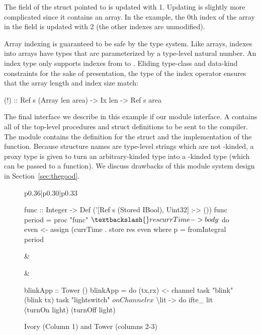 The  field of the struct pointed to is updated with 1.  Updating
 is slightly more complicated since it contains an array. In
the example, the 0th index of the array in the  field is updated with 2
(the other indexes are unmodified).

Array indexing is guaranteed to be safe by the type system.  Like arrays,
indexes into arrays have types that are parameterized by a type-level natural
number.  An index type  only supports indexes from  to .
Eliding type-class and data-kind constraints for the sake of presentation, the
type of the index operator ensures that the array length and index size match:
\begin{code}
(!) :: Ref s (Array len area) -> Ix len -> Ref s area
\end{code}

The final interface we describe in this example if our module interface.
A  contains all of the top-level procedures and struct definitions to
be sent to the compiler.  The module  contains the definition
for the struct and the implementation of the function.  Because structure names
are type-level strings which are not \cd{*}-kinded, a proxy type is given to
turn an arbitrary-kinded type into a \cd{*}-kinded type (which can be passed to
a function). We discuss drawbacks of this module system design in
Section~\ref{sec:thegood}.

\begin{figure*}
  \begin{tabular}{p{}|p{}|p{}}
    \begin{smcode}
func :: Integer
     -> Def ('[Ref s (Stored IBool), Uint32]
             :-> ())
func period = proc "func" $ \textbackslash{}res currTime ->
  body $ do
    even <- assign (currTime .%
    store res even
    where
    p = fromIntegral period
    \end{smcode} &
     &
    \begin{smcode}
blinkApp :: Tower ()
blinkApp = do
  (tx,rx) <- channel
  task "blink" (blink tx)
  task "lightswitch" $
    onChannel rx $
      \textbackslash{}lit -> do
        ifte_ lit (turnOn light)
                  (turnOff light)
    \end{smcode}
  \end{tabular}
  \caption{Ivory (Column 1) and Tower (columns 2-3)}
  \label{fig:tower-ex}
\end{figure*}
